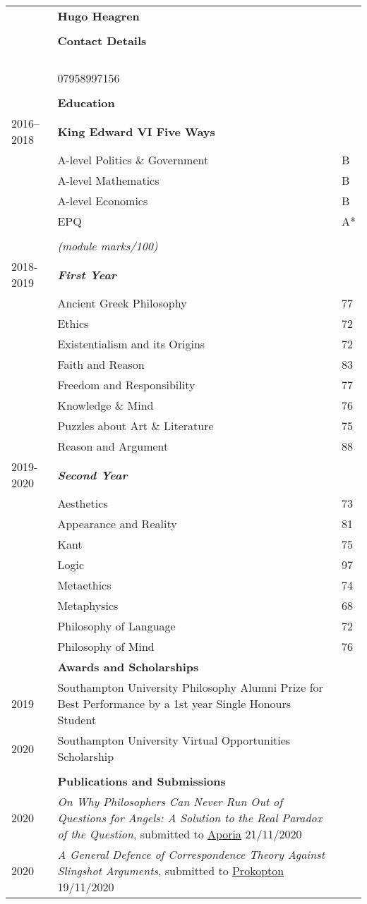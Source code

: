 \documentclass{article}
\makeatletter
\newcommand{\email}[1]{&%
    \IfEqCase{#1}{%
	    {personal}{\href{mailto:\personal}{\personal} \textit{(personal)}\\}
	    {academic}{\href{mailto:\academic}{\academic} \textit{(institution)}\\}
    }[\PackageError{email}{Undefined option to email: #1}{}]%
}
\renewcommand{\section}[1]{\\[-1.0ex]& \multicolumn{2}{l}{\bfseries{\Large{#1}}}\vspace{0.5ex}\\}
\newcommand{\entry}[3]{\scriptsize{\textsc{#1}} & #2 & #3 \\}
\newcommand{\pub}[3]{\entry{#1}{\textit{#2}, #3}{}}
\newcommand{\listentry}[3]{\entry{#1}{\bfseries{#2}}{#3} \\}
\newcommand{\listsub}[2]{\\ \scriptsize{#1} & \bfseries{\textit{#2}}&}
\newcommand{\etem}[2]{\\ & #1 & #2}
\renewcommand{\title}[1]{&\LARGE{\bfseries{#1}}&\\[6ex]}
\newcommand{\academic}{hbh1g18@soton.ac.uk}
\newcommand{\personal}{hugo@heagen.com}
\newcommand{\phone}{&07958997156\\}
\makeatother
\begin{document}
\begin{tabularx}{\textwidth}{ p{6em} X p{6em} }
\title{Hugo Heagren}
\section{Contact Details}
\email{academic}
\email{personal}
\phone

\section{Education} 
\listentry{2016--2018}{King Edward VI Five Ways}{
                 \etem{A-level Politics \& Government}{B}
                 \etem{A-level Mathematics}           {B}
                 \etem{A-level Economics}             {B}
                 \etem{EPQ}                           {A*}
}                

\listentry{from 2018}{BA Philosophy, University of Southampton}{
\\ & \textit{(module marks/100)}\noindent &
	    \listsub{2018-2019}{First Year}
            \etem{Ancient Greek Philosophy}        {77}
            \etem{Ethics}                          {72}
            \etem{Existentialism and its Origins}  {72}
            \etem{Faith and Reason}                {83}
            \etem{Freedom and Responsibility}      {77}
            \etem{Knowledge \& Mind}               {76}
            \etem{Puzzles about Art \& Literature} {75}
            \etem{Reason and Argument}             {88}
	    \listsub{2019-2020}{Second Year}
            \etem{Aesthetics}                      {73}
            \etem{Appearance and Reality}          {81}
            \etem{Kant}                            {75}
            \etem{Logic}                           {97}
            \etem{Metaethics}                      {74}
            \etem{Metaphysics}                     {68}
            \etem{Philosophy of Language}          {72}
            \etem{Philosophy of Mind}              {76}
}
\section{Awards and Scholarships}
\entry{2019}{Southampton University Philosophy Alumni Prize for Best Performance by a 1st year Single Honours Student}{}
\entry{2020}{Southampton University Virtual Opportunities Scholarship}{}

\section{Publications and Submissions}
\pub{2020}{On Why Philosophers Can Never Run Out of Questions for Angels: A Solution to the Real Paradox of the Question}{submitted to \href{https://ojs.st-andrews.ac.uk/index.php/aporia/index}{Aporia} 21/11/2020}
\pub{2020}{A General Defence of Correspondence Theory Against Slingshot Arguments}{submitted to \href{https://prokopton.bilkent.edu.tr/}{Prokopton} 19/11/2020}


\end{tabularx}
\end{document}
